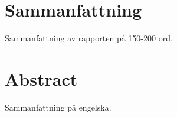 \section*{Sammanfattning}
%
Sammanfattning av rapporten på 150-200 ord.

\section*{Abstract}
%
Sammanfattning på engelska.